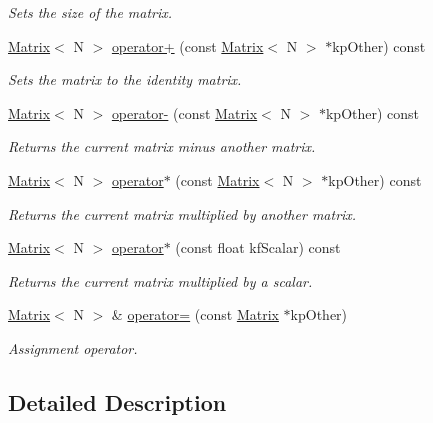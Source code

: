 \begin{DoxyCompactItemize}
\begin{DoxyCompactList}\small\item\em Sets the size of the matrix. \end{DoxyCompactList}\item 
\hyperlink{class_matrix}{Matrix}$<$ N $>$ \hyperlink{class_matrix_a2136b90f9ac8b15c3d01873c7505a5ca}{operator+} (const \hyperlink{class_matrix}{Matrix}$<$ N $>$ $\ast$kp\+Other) const 
\begin{DoxyCompactList}\small\item\em Sets the matrix to the identity matrix. \end{DoxyCompactList}\item 
\hyperlink{class_matrix}{Matrix}$<$ N $>$ \hyperlink{class_matrix_ab43f0fe9ef6d2fb13e4b320faa9309ad}{operator-\/} (const \hyperlink{class_matrix}{Matrix}$<$ N $>$ $\ast$kp\+Other) const 
\begin{DoxyCompactList}\small\item\em Returns the current matrix minus another matrix. \end{DoxyCompactList}\item 
\hyperlink{class_matrix}{Matrix}$<$ N $>$ \hyperlink{class_matrix_a2f45d0a6c687b34e8392b1683b497f2b}{operator$\ast$} (const \hyperlink{class_matrix}{Matrix}$<$ N $>$ $\ast$kp\+Other) const 
\begin{DoxyCompactList}\small\item\em Returns the current matrix multiplied by another matrix. \end{DoxyCompactList}\item 
\hyperlink{class_matrix}{Matrix}$<$ N $>$ \hyperlink{class_matrix_a78d0b17326e06680d3235f56cbb07eeb}{operator$\ast$} (const float kf\+Scalar) const 
\begin{DoxyCompactList}\small\item\em Returns the current matrix multiplied by a scalar. \end{DoxyCompactList}\item 
\hyperlink{class_matrix}{Matrix}$<$ N $>$ \& \hyperlink{class_matrix_aa0b29bc78592dba6988b7671c834645b}{operator=} (const \hyperlink{class_matrix}{Matrix} $\ast$kp\+Other)
\begin{DoxyCompactList}\small\item\em Assignment operator. \end{DoxyCompactList}\end{DoxyCompactItemize}


\subsection{Detailed Description}
